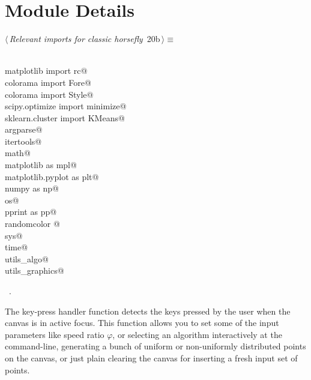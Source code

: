 \documentclass[11.5pt]{report}
\begin{document}
\section{Module Details}

\newchunk 
\begin{flushleft} \small\label{scrap12}\raggedright\small
{} $\langle\,${\itshape Relevant imports for classic horsefly}\nobreak\ {\footnotesize {20b}}$\,\rangle\equiv$
\vspace{-1ex}
\begin{list}{}{} \item
\mbox{}\verb@@\\
\mbox{}\verb@from matplotlib import rc@\\
\mbox{}\verb@from colorama import Fore@\\
\mbox{}\verb@from colorama import Style@\\
\mbox{}\verb@from scipy.optimize import minimize@\\
\mbox{}\verb@from sklearn.cluster import KMeans@\\
\mbox{}\verb@import argparse@\\
\mbox{}\verb@import itertools@\\
\mbox{}\verb@import math@\\
\mbox{}\verb@import matplotlib as mpl@\\
\mbox{}\verb@import matplotlib.pyplot as plt@\\
\mbox{}\verb@import numpy as np@\\
\mbox{}\verb@import os@\\
\mbox{}\verb@import pprint as pp@\\
\mbox{}\verb@import randomcolor @\\
\mbox{}\verb@import sys@\\
\mbox{}\verb@import time@\\
\mbox{}\verb@import utils_algo@\\
\mbox{}\verb@import utils_graphics@\\
\mbox{}\verb@@{\NWsep}
\end{list}
\vspace{-1.5ex}
\footnotesize
\begin{list}{}{\setlength{\itemsep}{-\parsep}\setlength{\itemindent}{-\leftmargin}}
\item \NWtxtMacroRefIn\ .

\item{}
\end{list}
\vspace{4ex}
\end{flushleft}
\newchunk The key-press handler function detects the keys pressed by the user when the canvas
is in active focus. This function allows you to set some of the input parameters like 
speed ratio $\varphi$, or selecting an algorithm interactively at the command-line, 
generating a bunch of uniform or non-uniformly distributed points on the canvas, 
or just plain clearing the canvas for inserting a fresh input set of points. 
\end{document}
